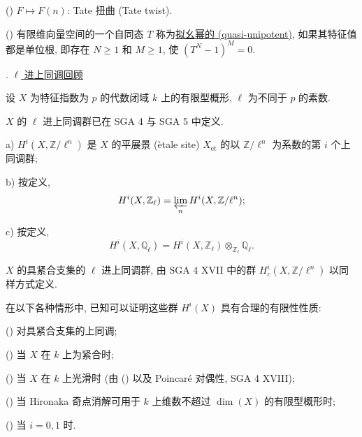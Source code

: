 () $F\longmapsto F(n)$: Tate 扭曲 (Tate twist).

() 有限维向量空间的一个自同态 $T$ 称为\underline{拟幺幂的 (quasi-unipotent)}, 如果其特征值都是单位根, 即存在 $N\geqslant 1$ 和 $M\geqslant 1$, 使 $(T^N-1)^M=0$.



. \underline{$\ell$ 进上同调回顾}

设 $X$ 为特征指数为 $p$ 的代数闭域 $k$ 上的有限型概形, $\ell$ 为不同于 $p$ 的素数.

$X$ 的 $\ell$ 进上同调群已在 SGA 4 与 SGA 5 中定义.

a) $H^i(X,\mathbb{Z}/\ell^n)$ 是 $X$ 的平展景 (\`etale site) $X_{\mathrm{et}}$ 的以 $\mathbb{Z}/\ell^n$ 为系数的第 $i$ 个上同调群;

b) 按定义,
\[
H^i(X,\mathbb{Z}_\ell)=\varprojlim_n H^i(X,\mathbb{Z}/\ell^n);
\]

c) 按定义,
\[
H^i(X,\mathbb{Q}_\ell)=H^i(X,\mathbb{Z}_\ell)\otimes_{\mathbb{Z}_\ell}\mathbb{Q}_\ell.
\]

$X$ 的具紧合支集的 $\ell$ 进上同调群, 由 SGA 4 XVII 中的群 $H^i_c(X,\mathbb{Z}/\ell^n)$ 以同样方式定义.

在以下各种情形中, 已知可以证明这些群 $H^i(X)$ 具有合理的有限性性质:

() 对具紧合支集的上同调;

() 当 $X$ 在 $k$ 上为紧合时;

() 当 $X$ 在 $k$ 上光滑时 (由 () 以及 Poincar\'e 对偶性, SGA 4 XVIII);

() 当 Hironaka 奇点消解可用于 $k$ 上维数不超过 $\dim(X)$ 的有限型概形时;

() 当 $i=0,1$ 时.


